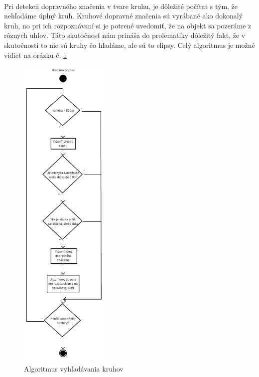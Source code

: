 \documentclass[12pt]{article}
\begin{document}
\paragraph{}
Pri detekcii dopravného značenia v tvare kruhu, je dôležité počítať s tým, že nehľadáme úplný kruh. Kruhové dopravné značenia sú vyrábané ako dokonalý kruh,
no pri ich rozpoznávaní si je potrené uvedomiť, že na objekt sa pozeráme z rôznych uhlov. Táto skutočnosť nám prináša do prolematiky dôležitý fakt,
že v skutočnosti to nie sú kruhy čo hľadáme, ale sú to elipsy. Celý algoritmus je možné vidieť na orázku č. \ref{hladanie_kruhov}

\begin{figure}[p]
\centering
\includegraphics[width=0.38\textwidth,natwidth=318,natheight=1164]{hladanie_kruhov.jpg}
\vspace{-20pt}
\caption{Algoritmus vyhľadávania kruhov}
\vspace{-10pt}
\label{hladanie_kruhov}
\end{figure}
\end{document}
